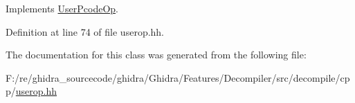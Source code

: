 Implements \mbox{\hyperlink{class_user_pcode_op_a2a7b7c637369bc4fba4604cd83a937af}{User\+Pcode\+Op}}.



Definition at line 74 of file userop.\+hh.



The documentation for this class was generated from the following file\+:\begin{DoxyCompactItemize}
\item 
F\+:/re/ghidra\+\_\+sourcecode/ghidra/\+Ghidra/\+Features/\+Decompiler/src/decompile/cpp/\mbox{\hyperlink{userop_8hh}{userop.\+hh}}\end{DoxyCompactItemize}
